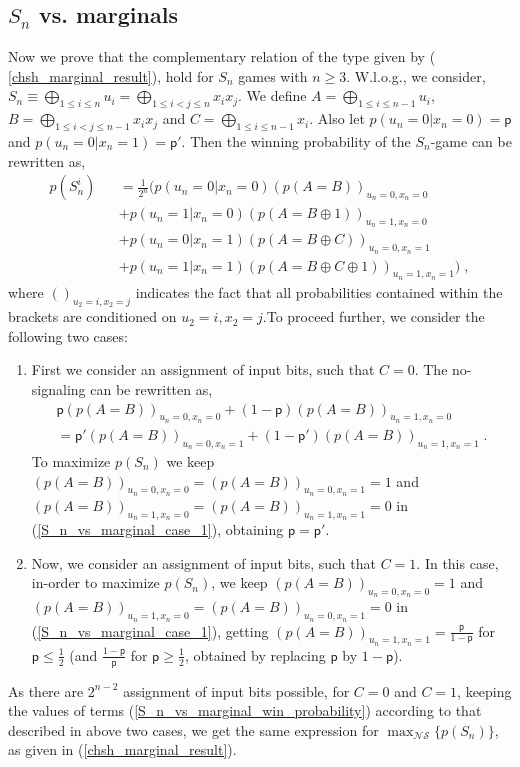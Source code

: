\begin{widetext}
\begin{appendices}
\subsection*{${S_n}$ {vs. marginals}}
\noindent
Now we prove that the complementary relation of the type given by ( \ref{chsh_marginal_result}), hold for $S_n$ games with $n \ge 3$. W.l.o.g., we consider, $S_n \equiv  \bigoplus_{1\le i \le n} u_i = \bigoplus_{1\le i<j \le n} x_i x_j$. We define $A=\bigoplus_{1\le i \le n-1}u_i$, $B=\bigoplus_{1\le i<j \le n-1}x_ix_j$ and $C=\bigoplus_{1\le i \le n-1}x_i$. Also let $p(u_n=0|x_n=0)=\mathsf{p}$ and $p(u_n=0|x_n=1)=\mathsf{p}{'}$. Then the winning probability of the $S_n$-game can be rewritten as,
\begin{eqnarray}
\label{S_n_vs_marginal_win_probability}
p({S_n^i}) &&= \frac{1}{2^n} \Bigg( p(u_n=0|x_n=0)(p(A=B))_{u_n=0,x_n=0}
{}\nonumber\\&&+p(u_n=1|x_n=0)(p(A=B\oplus1))_{u_n=1,x_n=0}{}\nonumber\\&&
+p(u_n=0|x_n=1)(p(A=B\oplus C))_{u_n=0,x_n=1}
{}\nonumber\\&&+p(u_n=1|x_n=1)(p(A=B\oplus C \oplus 1))_{u_n=1,x_n=1} \Bigg)  \; ,
\end{eqnarray}
where $()_{u_2=i,x_2=j}$ indicates the fact that all probabilities contained within the brackets are conditioned on $u_2=i,x_2=j$.To proceed further, we consider the following two cases:
\begin{enumerate}
\item First we consider an assignment of input bits, such that $C=0$. The no-signaling can be rewritten as,
\begin{eqnarray}
\label{S_n_vs_marginal_case_1}
\mathsf{p}(p(A=B))_{u_n=0,x_n=0}+(1-\mathsf{p})(p(A=B))_{u_n=1,x_n=0} \\=
\mathsf{p}{'}(p(A=B))_{u_n=0,x_n=1}+(1-\mathsf{p}{'})(p(A=B))_{u_n=1,x_n=1}
{}\nonumber \; .
\end{eqnarray}
To maximize $p({S_n})$ we keep $(p(A=B))_{u_n=0,x_n=0}=(p(A=B))_{u_n=0,x_n=1}=1$ and $(p(A=B))_{u_n=1,x_n=0}=(p(A=B))_{u_n=1,x_n=1}=0$ in (\ref{S_n_vs_marginal_case_1}), obtaining $\mathsf{p}=\mathsf{p}{'}$.
\\
\item Now, we consider an assignment of input bits, such that $C=1$. In this case, in-order to maximize $p({S_n})$, we keep 
$(p(A=B))_{u_n=0,x_n=0}=1$ and $(p(A=B))_{u_n=1,x_n=0}=(p(A=B))_{u_n=0,x_n=1}=0$ in (\ref{S_n_vs_marginal_case_1}), getting $(p(A=B))_{u_n=1,x_n=1}=\frac{\mathsf{p}}{1-\mathsf{p}}$ for $\mathsf{p} \le \frac{1}{2}$ (and $\frac{1-\mathsf{p}}{\mathsf{p}}$ for $\mathsf{p} \ge \frac{1}{2}$, obtained by replacing $\mathsf{p}$ by $1-\mathsf{p}$).
\end{enumerate}
As there are $2^{n-2}$ assignment of input bits possible, for $C=0$ and $C=1$, keeping the values of terms (\ref{S_n_vs_marginal_win_probability}) according to that described in above two cases, we get the same expression for $\max_{\mathcal{NS}}  \{p({S_n})\}$, as given in (\ref{chsh_marginal_result}).



\end{appendices}
\end{widetext}
